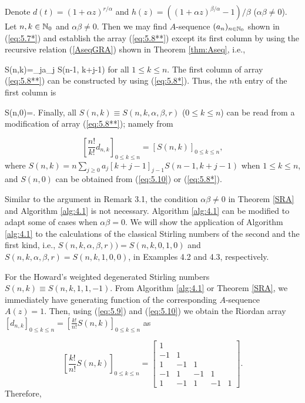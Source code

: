 \begin{algorithm}\label{alg:4.1}
Denote $d(t)= (1+\alpha z)^{r/\alpha}$ and $h(z)=((1+\alpha z)^{\beta/\alpha}-1)/\beta$ ($\alpha\beta\not= 0$). Let $n,k\in{{\mathbb N}}_0$ and $\alpha\beta\not= 0$. Then we may find $A$-sequence $(a_n)_{n \in {{\mathbb N}}_0}$ shown in (\ref{eq:5.7*}) and establish the array (\ref{eq:5.8**}) except its first column by using the recursive relation (\ref{AseqGRA}) shown in Theorem \ref{thm:Aseq}, i.e.,

\be\label{eq:5.9}
 S(n,k)=\sum_{j}a_j  S(n-1, k+j-1)
\ee
for all $1\leq k\leq n$. The first column of array (\ref{eq:5.8**}) can be constructed by using (\ref{eq:5.8*}). Thus, the $n$th entry of the first column is

\be\label{eq:5.10}
 S(n,0)=.
\ee
Finally, all $S(n,k)\equiv S(n,k,\alpha,\beta,r)$ ($0\leq k\leq n$) can be read from a modification of array (\ref{eq:5.8**}); namely from

\[
\left[ \frac{n!}{k!} d_{n,k}\right]_{0\leq k\leq n}=\left[ S(n,k)\right]_{0\leq k\leq n},
\]
where $S(n,k)=n\sum_{j\geq 0}a_j  [k+j-1]_{j-1} S(n-1, k+j-1)$ when $1\leq k\leq n$,
and $S(n,0)$ can be obtained from (\ref{eq:5.10}) or (\ref{eq:5.8*}).
\end{algorithm}
\medbreak

 Similar to the argument in Remark 3.1, the condition $\alpha\beta \not= 0$ in Theorem \ref{SRA} and Algorithm \ref{alg:4.1} is not necessary. Algorithm \ref{alg:4.1} can be modified to adapt some of cases when $\alpha\beta =0$. We will show the application of Algorithm \ref{alg:4.1} to the calculations of the classical Stirling numbers of the second and the first kind, i.e., $S(n,k, \alpha, \beta, r))=S(n,k,0,1,0)$ and $S(n,k,\alpha, \beta, r)=S(n,k,1,0,0)$, in Examples 4.2 and 4.3, respectively.

\medbreak

For the Howard's weighted degenerated Stirling numbers $S(n,k)\equiv S(n,k, 1,1,-1)$. From Algorithm \ref{alg:4.1} or Theorem \ref{SRA}, we immediately have generating function of the corresponding $A$-sequence $A(z)=1$.
Then, using (\ref{eq:5.9}) and (\ref{eq:5.10}) we obtain the Riordan array $[d_{n,k}]_{0\leq k\leq n}=\left[ \frac{k!}{n!} S(n,k)\right]_{0\leq k\leq n}$ as

\[
\left[ \frac{k!}{n!} S(n,k)\right]_{0\leq k\leq n}=\left[ \begin{array}{rrrrr} 1 &  & & &  \\
-1 &1 & & & \\ 1 &-1& 1& &  \\ -1 & 1& -1 &1 & \\ 1 & -1& 1& -1& 1\end{array}\right].
\]
Therefore,

